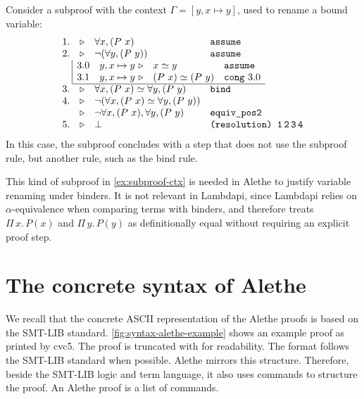 \begin{example}\label{ex:subproof-ctx}
Consider a subproof with the context $\Gamma = [y, x \mapsto y]$, used to rename a bound variable:
\[
\begin{array}{r c l l}
1. & \triangleright & \forall x, (P~x) & \kw{assume} \\
2. & \triangleright & \neg (\forall y, (P~y)) & \kw{assume} \\
\multicolumn{4}{l}{%
\begin{array}{r |r c l l}
& 3.0 & y, x \mapsto y~\triangleright & x \simeq y & \kw{assume} \\
& 3.1 & y, x \mapsto y~\triangleright & (P~x) \simeq (P~y) & \kw{cong}~3.0 \\
\cline{2-5}
\end{array}
} \\
3. & \triangleright & \forall x, (P~x) \simeq \forall y, (P~y) & \kw{bind} \\
4. & \triangleright & \neg(\forall x, (P~x) \simeq \forall y, (P~y)) & \\
  & \triangleright & \neg  \forall x, (P~x),  \forall y, (P~y) & \kw{equiv\_pos2} \\

5. & \triangleright & \bot & \kw{(resolution)~1\,2\,3\,4}
\end{array}
\]
In this case, the subproof concludes with a step that does not use the subproof rule, but another rule, such as the bind rule.
\end{example}

\begin{remark}
This kind of subproof in \cref{ex:subproof-ctx} is needed in Alethe to justify variable renaming under binders.
It is not relevant in Lambdapi, since Lambdapi relies on $\alpha$-equivalence when comparing terms with binders,
and therefore treats $\Pi\,x.\,P(x)$ and $\Pi\,y.\,P(y)$ as definitionally equal without requiring an explicit proof step.
\end{remark}

\section{The concrete syntax of Alethe}

We recall that the concrete ASCII representation of the Alethe proofs is based on the SMT-LIB standard.
\cref{fig:syntax-alethe-example} shows an example proof as printed by cvc5. The proof is truncated with for readability.
The format follows the SMT-LIB standard when possible.
Alethe mirrors this structure. Therefore, beside the SMT-LIB logic and term language, it also uses commands to structure the proof.
An Alethe proof is a list of commands.

